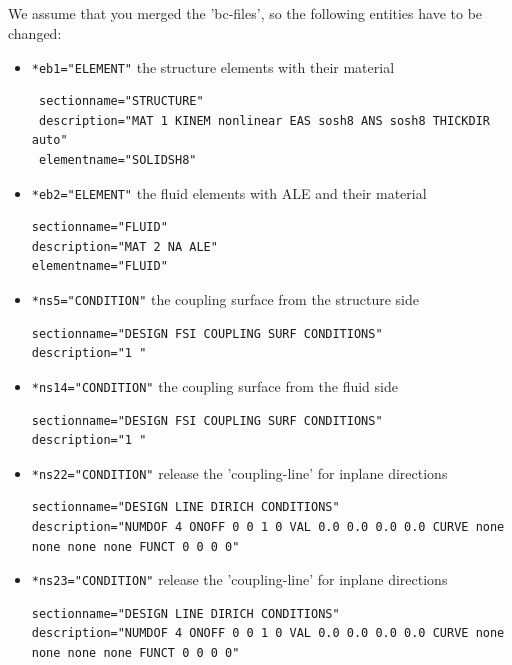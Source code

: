 \subsection{\bc}
We assume that you merged the 'bc-files', so the following entities have to be changed:

\begin{itemize}
 \item \verb|*eb1="ELEMENT"| \qquad the structure elements with their material
 \begin{small} \begin{verbatim}
 sectionname="STRUCTURE"
 description="MAT 1 KINEM nonlinear EAS sosh8 ANS sosh8 THICKDIR auto"
 elementname="SOLIDSH8"
 \end{verbatim} \end{small}

 \item \verb|*eb2="ELEMENT"| \qquad the fluid elements with ALE and their material
 \begin{small} \begin{verbatim}
sectionname="FLUID"
description="MAT 2 NA ALE"
elementname="FLUID"
\end{verbatim} \end{small}

\item \verb|*ns5="CONDITION"|  \qquad the coupling surface from the structure side
\begin{small} \begin{verbatim}
sectionname="DESIGN FSI COUPLING SURF CONDITIONS"
description="1 "
 \end{verbatim} \end{small}

\item \verb|*ns14="CONDITION"| \qquad the coupling surface from the fluid side
\begin{small} \begin{verbatim}
sectionname="DESIGN FSI COUPLING SURF CONDITIONS"
description="1 "
 \end{verbatim} \end{small}

\item \verb|*ns22="CONDITION"| \qquad release the 'coupling-line' for inplane directions
\begin{small} \begin{verbatim}
sectionname="DESIGN LINE DIRICH CONDITIONS"
description="NUMDOF 4 ONOFF 0 0 1 0 VAL 0.0 0.0 0.0 0.0 CURVE none none none none FUNCT 0 0 0 0"
 \end{verbatim} \end{small}

\item \verb|*ns23="CONDITION"| \qquad release the 'coupling-line' for inplane directions
\begin{small} \begin{verbatim}
sectionname="DESIGN LINE DIRICH CONDITIONS"
description="NUMDOF 4 ONOFF 0 0 1 0 VAL 0.0 0.0 0.0 0.0 CURVE none none none none FUNCT 0 0 0 0"
 \end{verbatim} \end{small}
\end{itemize}

